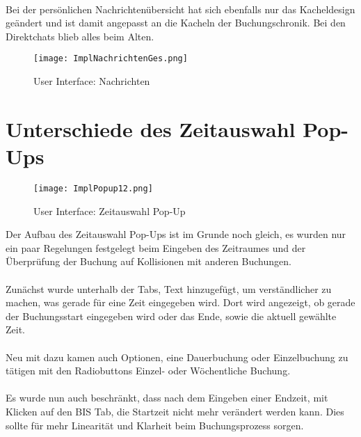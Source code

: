 \paragraph{}
Bei der persönlichen Nachrichtenübersicht hat sich ebenfalls nur das Kacheldesign geändert und ist damit angepasst an die Kacheln der Buchungschronik.
Bei den Direktchats blieb alles beim Alten.
\vspace{29mm}
\begin{figure}[!h]
  \centering
  \texttt{[image: ImplNachrichtenGes.png]}
  \caption{User Interface: Nachrichten}
  \label{fig:UI_Messages}
\end{figure}

\newpage

\section{Unterschiede des Zeitauswahl Pop-Ups}

\begin{figure}[!h]
  \centering
  \texttt{[image: ImplPopup12.png]}
  \caption{User Interface: Zeitauswahl Pop-Up}
  \label{fig:UI_timePopUp}
\end{figure}

Der Aufbau des Zeitauswahl Pop-Ups ist im Grunde noch gleich, es wurden nur ein paar Regelungen festgelegt beim Eingeben des Zeitraumes und der Überprüfung der Buchung auf Kollisionen mit anderen Buchungen.
\paragraph{}
Zunächst wurde unterhalb der Tabs, Text hinzugefügt, um verständlicher zu machen, was gerade für eine Zeit eingegeben wird.
Dort wird angezeigt, ob gerade der Buchungsstart eingegeben wird oder das Ende, sowie die aktuell gewählte Zeit.
\\\\
Neu mit dazu kamen auch Optionen, eine Dauerbuchung oder Einzelbuchung zu tätigen mit den Radiobuttons Einzel- oder Wöchentliche Buchung.
\paragraph{}
Es wurde nun auch beschränkt, dass nach dem Eingeben einer Endzeit, mit Klicken auf den BIS Tab, die Startzeit nicht mehr verändert werden kann.
Dies sollte für mehr Linearität und Klarheit beim Buchungsprozess sorgen.

